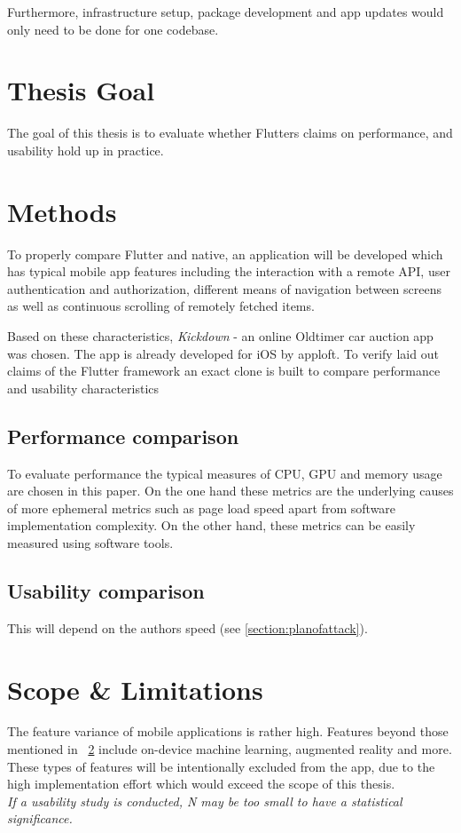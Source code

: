 Furthermore, infrastructure setup, package development and app updates would only need to be done for one codebase.

\section{Thesis Goal}
The goal of this thesis is to evaluate whether Flutters claims on performance, and usability hold up in practice.

\section{Methods}
\label{section:methods}
To properly compare Flutter and native, an application will be developed which has typical mobile app features including the interaction with a remote API, user authentication and authorization, different means of navigation between screens as well as continuous scrolling of remotely fetched items.

Based on these characteristics, \textit{Kickdown} - an online Oldtimer car auction app was chosen. The app is already developed for iOS by apploft. 
To verify laid out claims of the Flutter framework an exact clone is built to compare performance and usability characteristics

\subsection{Performance comparison}
To evaluate performance the typical measures of CPU, GPU and memory usage are chosen in this paper. On the one hand these metrics are the underlying causes of more ephemeral metrics such as page load speed apart from software implementation complexity. On the other hand, these metrics can be easily measured using software tools.

\subsection{Usability comparison}
This will depend on the authors speed (see \ref{section:planofattack}).

\section{Scope \& Limitations}
The feature variance of mobile applications is rather high. Features beyond those mentioned in ~\ref{section:methods} include on-device machine learning, augmented reality and more. These types of features will be intentionally excluded from the app, due to the high implementation effort which would exceed the scope of this thesis.\\
\textit{If a usability study is conducted, N may be too small to have a statistical significance.}

